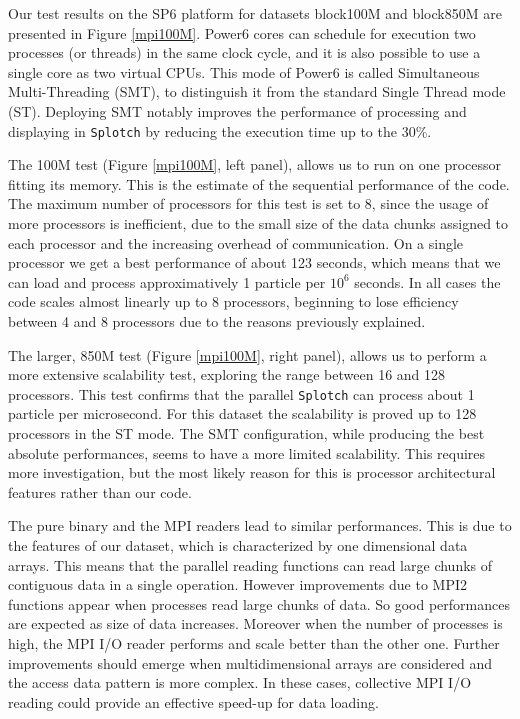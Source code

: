Our test results on the SP6 platform for datasets block100M and block850M 
are presented in Figure \ref{mpi100M}.
Power6 cores can schedule for execution two processes (or threads) in the same clock cycle, 
and it is also possible to use a single core as two virtual CPUs. This mode of Power6 
is called Simultaneous Multi-Threading (SMT), to distinguish it from 
the standard Single Thread mode (ST).
Deploying SMT notably improves the performance 
of processing and displaying in {\tt Splotch} by reducing the execution time up to  
the $30\%$. 

The 100M test (Figure \ref{mpi100M}, left panel), allows us 
to run on one processor fitting its memory. 
This is the estimate of the sequential performance of the code. 
The maximum number of processors for this test is set to 8, since the usage of 
more processors is inefficient, due to the small size 
of the data chunks assigned to each processor and the increasing overhead of communication.
On a single processor we get a best performance of about 123 seconds, which means that 
we can load and process approximatively 1 particle per $10^6$ seconds. 
In all cases the code scales almost linearly up to 8 processors, beginning to lose
efficiency between 4 and 8 processors due to the reasons previously explained. 

The larger, 850M test (Figure \ref{mpi100M}, right panel), 
allows us to perform a more extensive scalability test, 
exploring the range between 16 and 128 processors. This test confirms that the parallel 
{\tt Splotch} can process about 1 particle per microsecond. For this dataset the scalability 
is proved up to 128 processors in the ST mode. The SMT configuration, 
while producing the best absolute performances, seems to have a more limited scalability. 
This requires more investigation, but the most likely reason for this is processor 
architectural features rather than our code.

The pure binary and the MPI readers lead to similar performances. This is due to the features 
of our dataset, which is characterized by one dimensional data arrays. This means 
that the parallel reading functions can read large chunks of contiguous data 
in a single operation. However improvements due to MPI2 functions appear when 
processes read large chunks of data. So good performances are expected as size of data increases. 
Moreover when the number of processes is high, the MPI I/O reader performs and scale 
better than the other one. Further improvements should emerge when multidimensional 
arrays are considered and the access data pattern is more complex. 
In these cases, collective MPI I/O reading could provide an effective speed-up for data loading.

